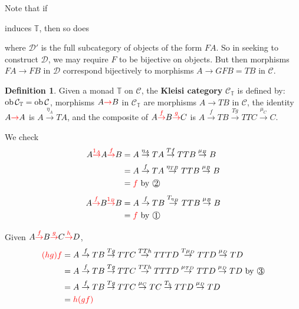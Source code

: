 \documentclass[a4paper]{article}
\theoremstyle{definition}
\newtheorem{definition}{Definition}
\theoremstyle{remark}
\theoremstyle{default}
\numberwithin{definition}{section}
\newcommand*\ob[1]{\textnormal{ob}\,#1}
\newcommand*\circbox[1]{\raisebox{.5pt}{\textcircled{\raisebox{-.9pt} {#1}}}}
\begin{document}
Note that if
induces $\mathbb{T}$,
then so does
where $\mathcal{D}'$ is the full subcategory of objects of the form $FA$.
So in seeking to construct $\mathcal{D}$, we may require $F$ to be bijective on objects.
But then morphisms $FA \to FB$ in $\mathcal{D}$ correspond bijectively to morphisms $A \to GFB = TB$ in $\mathcal{C}$.

\begin{definition}
	Given a monad $\mathbb{T}$ on $\mathcal{C}$,
	the \textbf{Kleisi category} $\mathcal{C}_\mathbb{T}$ is defined by:
	$\ob \mathcal{C}_\mathbb{T} = \ob\mathcal{C}$,
	morphisms $A \textcolor{red}{\to} B$ in $\mathcal{C}_\mathbb{T}$ are morphisms $A \to TB$ in $\mathcal{C}$,
	the identity $A \textcolor{red}{\to} A$ is $A \overset{\eta_A}{\to} TA$,
	and the composite of $A \textcolor{red}{\overset{f}{\to}} B \textcolor{red}{\overset{g}{\to}} C$ is 
	$A \overset{f}{\to} TB \overset{Tg}{\to} TTC \overset{\mu_C}{\to} C$.
	
	We check
	\begin{align*}
	A \textcolor{red}{\overset{1_A}{\to}} A \textcolor{red}{\overset{f}{\to}} B &= A \overset{\eta_A}{\to} TA \overset{Tf}{\to} TTB \overset{\mu_B}{\to} B \\
	&= A \overset{f}{\to} TA \overset{\eta_{TB}}{\to} TTB \overset{\mu_B}{\to} B \\
	&= \textcolor{red}{f} \text{ by \textnormal{\circbox{2}}}
	\end{align*}
	\begin{align*}
	A \textcolor{red}{\overset{f}{\to}} B \textcolor{red}{\overset{1_B}{\to}} B &= A \overset{f}{\to} TB \overset{T_{\eta_B}}{\to} TTB \overset{\mu_B}{\to} B \\
	&= \textcolor{red}{f} \text{ by \textnormal{\circbox{1}}}
	\end{align*}

	Given $A\textcolor{red}{\overset{f}{\to}} B \textcolor{red}{\overset{g}{\to}} C \textcolor{red}{\overset{h}{\to}} D$,
	\begin{align*}
		\textcolor{red}{(hg)f} &= A \overset{f}{\to} TB \overset{Tg}{\to} TTC \overset{TTh}{\to} TTTD \overset{T\mu_D}{\to} TTD \overset{\mu_D}{\to} TD \\
		&= A \overset{f}{\to} TB \overset{Tg}{\to} TTC \overset{TTh}{\to} TTTD \overset{\mu_{TD}}{\to} TTD \overset{\mu_D}{\to} TD \text{ by \textnormal{\circbox{3}}} \\
		&= A \overset{f}{\to} TB \overset{Tg}{\to} TTC \overset{\mu_C}{\to} TC \overset{T_h}{\to} TTD \overset{\mu_D}{\to} TD \\
		&= \textcolor{red}{h(gf)}
	\end{align*}
\end{definition}
\end{document}

